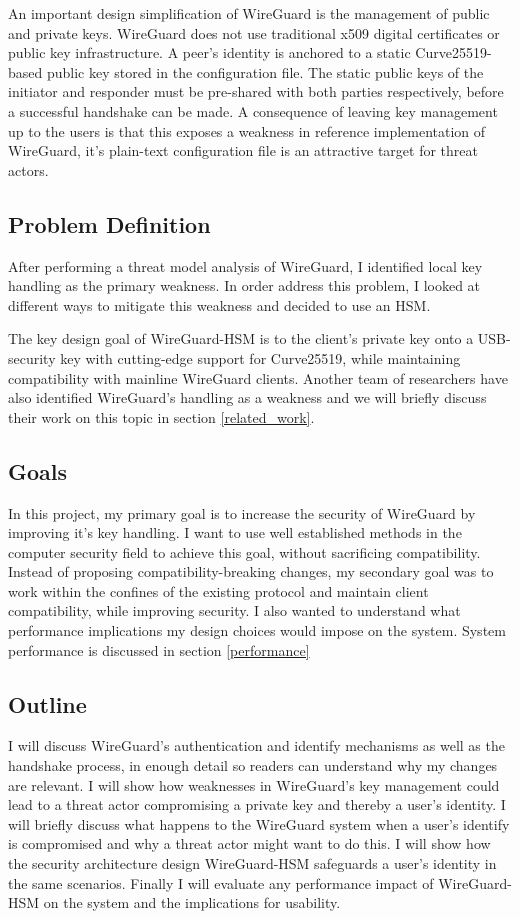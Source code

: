 \documentclass [11pt, proquest] {uwthesis}[2020/02/24]
\begin{document}
An important design simplification of WireGuard is the management of public and private keys. WireGuard does not use traditional x509 digital certificates or public key infrastructure. A peer's identity is anchored to a static Curve25519-based public key stored in the configuration file.
The static public keys of the initiator and responder must be pre-shared with both parties respectively, before a successful handshake can be made. 
A consequence of leaving key management up to the users is that this exposes a weakness in reference implementation of WireGuard, it's plain-text configuration file is an attractive target for threat actors.


\subsection{Problem Definition} \label{problem_definition}
After performing a threat model analysis of WireGuard, I identified local key handling as the primary weakness. In order address this problem, I looked at different ways to mitigate this weakness and decided to use an HSM. 


The key design goal of WireGuard-HSM is to the client's private key onto a USB-security key with cutting-edge support for Curve25519, while maintaining compatibility with mainline WireGuard clients. 
Another team of researchers have also identified WireGuard's handling as a weakness and we will briefly discuss their work on this topic in section \ref{related_work}.

\subsection{Goals}
In this project, my primary goal is to increase the security of WireGuard by improving it's key handling. I want to use well established methods in the computer security field to achieve this goal, without sacrificing compatibility. Instead of proposing compatibility-breaking changes, my secondary goal was to work within the confines of the existing protocol and maintain client compatibility, while improving security. I also wanted to understand what performance implications my design choices would impose on the system. System performance is discussed in section \ref{performance}

\subsection{Outline}
I will discuss WireGuard's authentication and identify mechanisms as well as the handshake process, in enough detail so readers can understand why my changes are relevant.
I will show how weaknesses in WireGuard's key management could lead to a threat actor compromising a private key and thereby a user's identity. 
I will briefly discuss what happens to the WireGuard system when a user's identify is compromised and why a threat actor might want to do this.
I will show how the security architecture design WireGuard-HSM safeguards a user's identity in the same scenarios.
Finally I will evaluate any performance impact of WireGuard-HSM on the system and the implications for usability.
\end{document}
